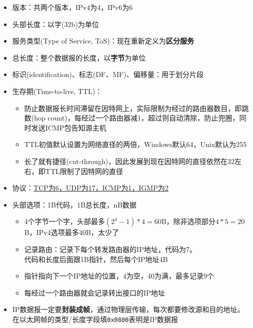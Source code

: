 \begin{itemize}
\item 版本：共两个版本，IPv4为4，IPv6为6
\item 头部长度：以字(32b)为单位
\item 服务类型(Type of Service, ToS)：现在重新定义为\textbf{区分服务}
\item 总长度：整个数据报的长度，以\textbf{字节}为单位
\item 标识(identification)、标志(DF、MF)、偏移量：用于划分片段
\item 生存期(Time-to-live, TTL)：
\begin{itemize}
	\item 防止数据报长时间滞留在因特网上，实际限制为经过的路由器数目，即跳数(hop count)，每经过一个路由器减1，超过则自动清除，防止兜圈，同时发送ICMP包告知源主机
	\item TTL初值默认设置为网络直径的两倍，Windows默认64，Unix默认为255
	\item 长了就有捷径(cut-through)，因此发展到现在因特网的直径依然在32左右，即TTL限制了因特网的直径
\end{itemize}
\item 协议：\underline{TCP为6，UDP为17，ICMP为1，IGMP为2}
\item 头部选项：1B代码，1B总长度，nB数据
\begin{itemize}
	\item 4个字节一个字，头部最多$(2^4-1)*4=60$B，除非选项部分$4*5=20$B，IPv4选项最多$40$B，太少了
	\item 记录路由：记录下每个转发路由器的IP地址，代码为7。\\
	代码和长度后面跟1B指针，然后每个IP地址4B
	\item 指针指向下一个IP地址的位置，4为空，40为满，最多记录9个
	\item 每经过一个路由器就会记录转出接口的IP地址
\end{itemize}
\item IP数据报一定要\textbf{封装成帧}，通过物理层传输，每次都要修改源和目的地址。
在以太网帧的类型/长度字段填\verb'0x0800'表明是IP数据报
\end{itemize}


